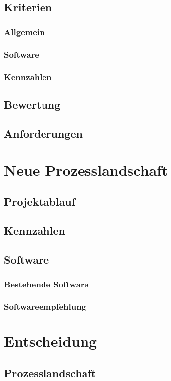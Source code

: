 \documentclass[
11pt, %
a4paper, %
BCOR25mm, %
DIV14, %
footsepline = false, %
headsepline, %
twoside, %
openright,
abstracton, %
listof=totocnumbered, %
bibliography=totocnumbered %
]{scrreprt}
\begin{document}
  \subsection{Kriterien}
  \subsubsection{Allgemein}
  \subsubsection{Software}
  \subsubsection{Kennzahlen}
  \subsection{Bewertung}
  \subsection{Anforderungen}
  \section{Neue Prozesslandschaft}
  \subsection{Projektablauf}
  \subsection{Kennzahlen}   
  \subsection{Software}
  \subsubsection{Bestehende Software}
  \subsubsection{Softwareempfehlung}
  \section{Entscheidung}
  \subsection{Prozesslandschaft}
\end{document}
